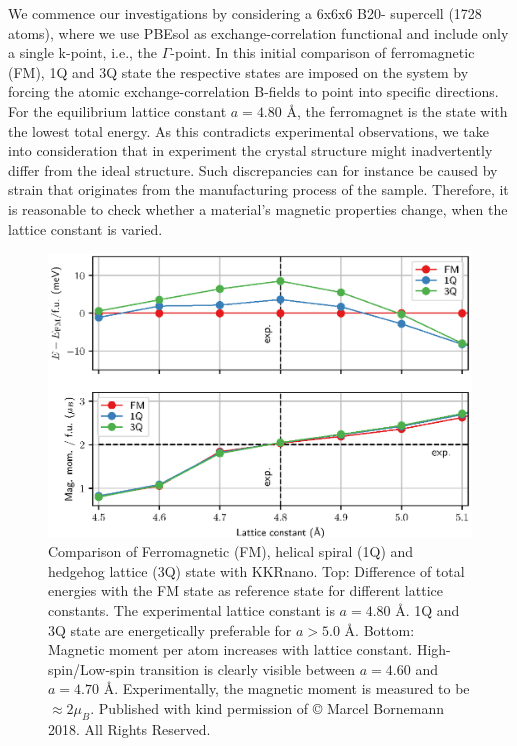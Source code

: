 \documentclass[graybox]{svmult}
\begin{document}
We commence our investigations by considering a 6x6x6 B20- supercell (1728 atoms), where we use PBEsol 
as exchange-correlation functional
and include only a single k-point, i.e., the $\Gamma$-point.
In this initial comparison of ferromagnetic (FM), 1Q and 3Q state the respective states are imposed on
the system by forcing the atomic exchange-correlation B-fields
to point into specific directions. 
For the equilibrium lattice constant
$a=4.80$ \AA, the ferromagnet is the state with the lowest total energy.
As this contradicts experimental observations, we take into consideration that
in experiment the crystal structure might inadvertently differ from the ideal structure.
Such discrepancies can for instance be caused by strain that 
originates from the manufacturing process of the sample.
Therefore, it is reasonable to check whether a material's magnetic properties change, when the
lattice constant is varied.
\begin{figure}[htb]
  \centering
   \includegraphics[width=1.00\textwidth]{Figures/MnGe_ferro_1q.eps}
	\caption{Comparison of Ferromagnetic (FM), helical spiral (1Q) and hedgehog lattice (3Q) 
	state with KKRnano.
	Top: Difference of total energies with the FM state as reference state for different
	lattice constants. The experimental lattice constant is $a=4.80$ \AA. 1Q and 3Q state
	are energetically preferable for $a > 5.0$ \AA.
	Bottom: Magnetic moment per  atom increases with lattice constant.
	High-spin/Low-spin transition is clearly visible between $a=4.60$ and $a=4.70$ \AA.
	Experimentally, the magnetic moment is measured to be $\approx 2 \mu_B$.
	Published with kind permission of © Marcel Bornemann 2018. All Rights Reserved.}
\label{fig:MnGe_kkrnano_comparison}
\end{figure}
\end{document}
